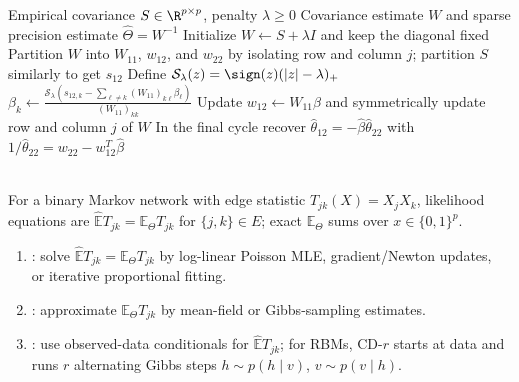 \begin{breakablealgorithm}
\caption{Graphical Lasso by Block Coordinate Descent}
\label{alg:sl-graphical-lasso}
\begin{algorithmic}
\Require Empirical covariance $S\in\R^{p\times p}$, penalty $\lambda\geq0$
\Ensure Covariance estimate $W$ and sparse precision estimate $\widehat{\Theta}=W^{-1}$
\State Initialize $W\gets S+\lambda I$ and keep the diagonal fixed
\Repeat
{}
\State Partition $W$ into $W_{11}$, $w_{12}$, and $w_{22}$ by isolating  row and column $j$; partition $S$ similarly to get $s_{12}$
\State Define $\mathcal{S}_\lambda(z)=\sign(z)(|z|-\lambda)_+$
\Repeat
{}
\State $\displaystyle \beta_k\gets
\frac{\mathcal{S}_\lambda\!\left(s_{12,k}-\sum_{\ell\neq k}(W_{11})_{k\ell}\beta_\ell\right)}
{(W_{11})_{kk}}$
\EndFor
{}
\State Update $w_{12}\gets W_{11}\beta$ and symmetrically update row and column $j$ of $W$
\EndFor
{}
\State In the final cycle recover $\widehat{\theta}_{12}=-\widehat{\beta}\widehat{\theta}_{22}$ with $1/\widehat{\theta}_{22}=w_{22}-w_{12}^T\widehat{\beta}$
\end{algorithmic} 
\end{breakablealgorithm}

\begin{method} \label{meth:sl-discrete-markov-network-learning} \\
For a binary Markov network with edge statistic $T_{jk}(X)=X_jX_k$, likelihood equations are $\widehat{\mathbb{E}}T_{jk}=\mathbb{E}_\Theta T_{jk}$ for $\{j,k\}\in E$; exact $\mathbb{E}_\Theta$ sums over $x\in\{0,1\}^p$.
\begin{enumerate}[label=(\roman*)]
\setlength{\itemsep}{0pt}
\item {}: solve $\widehat{\mathbb{E}}T_{jk}=\mathbb{E}_\Theta T_{jk}$ by log-linear Poisson MLE, gradient/Newton updates,\\
or iterative proportional fitting.
\item {}: approximate $\mathbb{E}_\Theta T_{jk}$ by mean-field or Gibbs-sampling estimates.
\item {}: use observed-data conditionals for $\widehat{\mathbb{E}}T_{jk}$; for RBMs, CD-$r$ starts at data and\\
runs $r$ alternating Gibbs steps $h\sim p(h\mid v)$, $v\sim p(v\mid h)$.
\end{enumerate}
\end{method}
